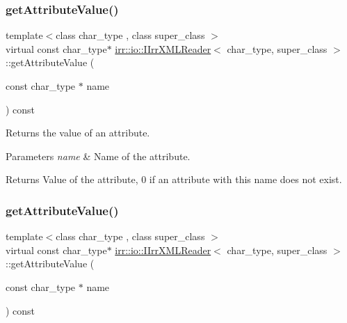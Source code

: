 \subsubsection{\texorpdfstring{get\+Attribute\+Value()}{getAttributeValue()}\hspace{0.1cm}{\footnotesize\ttfamily [3/4]}}
{\footnotesize\ttfamily template$<$class char\+\_\+type , class super\+\_\+class $>$ \\
virtual const char\+\_\+type$\ast$ \hyperlink{classirr_1_1io_1_1IIrrXMLReader}{irr\+::io\+::\+I\+Irr\+X\+M\+L\+Reader}$<$ char\+\_\+type, super\+\_\+class $>$\+::get\+Attribute\+Value (\begin{DoxyParamCaption}\item[{const char\+\_\+type $\ast$}]{name }\end{DoxyParamCaption}) const\hspace{0.3cm}{\ttfamily [pure virtual]}}



Returns the value of an attribute. 


\begin{DoxyParams}{Parameters}
{\em name} & Name of the attribute. \\
\hline
\end{DoxyParams}
\begin{DoxyReturn}{Returns}
Value of the attribute, 0 if an attribute with this name does not exist. 
\end{DoxyReturn}
\mbox{\label{classirr_1_1io_1_1IIrrXMLReader_adaac9a49b396e7fc2d335335f36391a9}} 
\subsubsection{\texorpdfstring{get\+Attribute\+Value()}{getAttributeValue()}\hspace{0.1cm}{\footnotesize\ttfamily [4/4]}}
{\footnotesize\ttfamily template$<$class char\+\_\+type , class super\+\_\+class $>$ \\
virtual const char\+\_\+type$\ast$ \hyperlink{classirr_1_1io_1_1IIrrXMLReader}{irr\+::io\+::\+I\+Irr\+X\+M\+L\+Reader}$<$ char\+\_\+type, super\+\_\+class $>$\+::get\+Attribute\+Value (\begin{DoxyParamCaption}\item[{const char\+\_\+type $\ast$}]{name }\end{DoxyParamCaption}) const\hspace{0.3cm}{\ttfamily [pure virtual]}}



